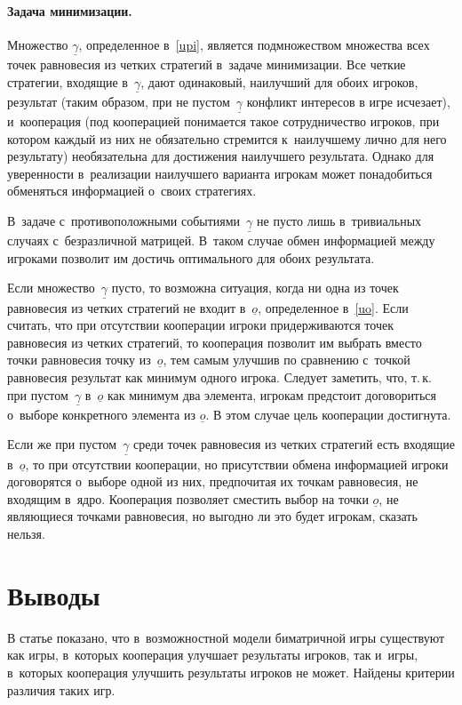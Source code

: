 \documentclass[twoside]{article}
\begin{document}
\paragraph{Задача минимизации.}
    \begin{Theorem}
Множество $\underline\gamma${\rm,} определенное в~\eqref{upi}{\rm,} является подмножеством
множества всех точек равновесия из четких стратегий в~задаче минимизации. Все четкие
стратегии{\rm,} входящие в~$\underline\gamma${\rm,} дают одинаковый{\rm,} наилучший для обоих
игроков{\rm,} результат (таким образом{\rm,} при не пустом~$\underline\gamma$ конфликт интересов в
игре исчезает){\rm,} и~кооперация (под кооперацией понимается такое сотрудничество игроков{\rm,}
при котором каждый из них не обязательно стремится к~наилучшему лично для него результату)
необязательна для достижения наилучшего результата. Однако для уверенности в~реализации наилучшего
варианта игрокам может понадобиться обменяться информацией о~своих стратегиях.

В~задаче с~противоположными событиями~$\underline\gamma$ не пусто лишь в~тривиальных случаях
с~безразличной матрицей. В~таком случае обмен информацией между игроками позволит им достичь
оптимального для обоих результата.

Если множество~$\underline\gamma$ пусто{\rm,} то возможна ситуация{\rm,} когда ни одна из точек
равновесия из четких стратегий не входит в~$\underline o$, определенное в~\eqref{uo}. Если
считать{\rm,} что при отсутствии кооперации игроки придерживаются точек равновесия из четких
стратегий{\rm,} то кооперация позволит им выбрать вместо точки равновесия точку из~$\underline
o${\rm,} тем самым улучшив по сравнению с~точкой равновесия результат как минимум одного игрока.
Следует заметить{\rm,} что{\rm,} т.\,к. при пустом~$\underline\gamma$ в~$\underline o$ как минимум
два элемента{\rm,} игрокам предстоит договориться о~выборе конкретного элемента из $\underline o$.
В этом случае цель кооперации достигнута.

Если же при пустом~$\underline\gamma$ среди точек равновесия из четких стратегий есть входящие
в~$\underline o${\rm,} то при отсутствии кооперации{\rm,} но присутствии обмена информацией игроки
договорятся о~выборе одной из них{\rm,} предпочитая их точкам равновесия{\rm,} не входящим в~ядро.
Кооперация позволяет сместить выбор на точки $\underline o${\rm,} не являющиеся точками
равновесия{\rm,} но выгодно ли это будет игрокам{\rm,} сказать нельзя.
\end{Theorem}

\section{Выводы}
В статье показано, что в~возможностной модели биматричной игры существуют как игры, в~которых
кооперация улучшает результаты игроков, так и~игры, в~которых кооперация улучшить результаты
игроков не может. Найдены критерии различия таких игр.
\end{document}
